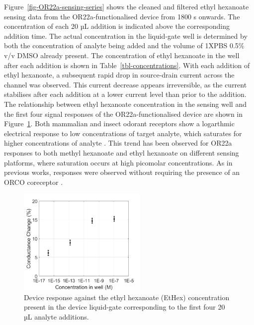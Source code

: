 \documentclass[
  a4paper,
]{scrbook}
\begin{document}
Figure~\ref{fig-OR22a-sensing-series} shows the cleaned and filtered
ethyl hexanoate sensing data from the OR22a-functionalised device from
1800 s onwards. The concentration of each 20 µL addition is indicated
above the corresponding addition time. The actual concentration in the
liquid-gate well is determined by both the concentration of analyte
being added and the volume of 1XPBS 0.5\% v/v DMSO already present. The
concentration of ethyl hexanoate in the well after each addition is
shown in Table~\ref{tbl-concentrations}. With each addition of ethyl
hexanoate, a subsequent rapid drop in source-drain current across the
channel was observed. This current decrease appears irreversible, as the
current stabilises after each addition at a lower current level than
prior to the addition. The relationship between ethyl hexanoate
concentration in the sensing well and the first four signal responses of
the OR22a-functionalised device are shown in
Figure~\ref{fig-EtHex-responses}. Both mammalian and insect odorant
receptors show a logarthmic electrical response to low concentrations of
target analyte, which saturates for higher concentrations of analyte
\autocite{Persaud1982,Khadka2019,Murugathas2020,Cheema2021}. This trend
has been observed for OR22a responses to both methyl hexanoate and ethyl
hexanoate on different sensing platforms, where saturation occurs at
high picomolar concentrations. As in previous works, responses were
observed without requiring the presence of an ORCO coreceptor
\autocite{Murugathas2019b,Murugathas2020,Khadka2019,Cheema2021}.

\begin{figure}

{\centering \includegraphics[width=0.55\textwidth,height=\textheight]{figures/ch8/solvent-sensing-no-curve.png}

}

\caption{\label{fig-EtHex-responses}Device response against the ethyl
hexanoate (EtHex) concentration present in the device liquid-gate
corresponding to the first four 20 µL analyte additions.}

\end{figure}
\end{document}

